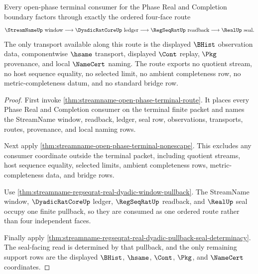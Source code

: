 \begin{theorem}
\label{thm:streamname-open-phase-four-face-lock}
Every open-phase terminal consumer for the Phase Real and Completion boundary factors through exactly the ordered four-face route
$$
\StreamNameUp\text{ window}\longrightarrow \DyadicRatCoreUp\text{ ledger}\longrightarrow \RegSeqRatUp\text{ readback}\longrightarrow \RealUp\text{ seal}.
$$
The only transport available along this route is the displayed $\BHist$ observation data, componentwise $\hsame$ transport, displayed $\Cont$ replay, $\Pkg$ provenance, and local $\NameCert$ naming. The route exports no quotient stream, no host sequence equality, no selected limit, no ambient completeness row, no metric-completeness datum, and no standard bridge row.
\end{theorem}
\begin{proof}
First invoke \autoref{thm:streamname-open-phase-terminal-route}. It places every Phase Real and Completion consumer on the terminal finite packet and names the StreamName window, readback, ledger, seal row, observations, transports, routes, provenance, and local naming rows.

Next apply \autoref{thm:streamname-open-phase-terminal-nonescape}. This excludes any consumer coordinate outside the terminal packet, including quotient streams, host sequence equality, selected limits, ambient completeness rows, metric-completeness data, and bridge rows.

Use \autoref{thm:streamname-regseqrat-real-dyadic-window-pullback}. The StreamName window, $\DyadicRatCoreUp$ ledger, $\RegSeqRatUp$ readback, and $\RealUp$ seal occupy one finite pullback, so they are consumed as one ordered route rather than four independent faces.

Finally apply \autoref{thm:streamname-regseqrat-real-dyadic-pullback-seal-determinacy}. The seal-facing read is determined by that pullback, and the only remaining support rows are the displayed $\BHist$, $\hsame$, $\Cont$, $\Pkg$, and $\NameCert$ coordinates.
\end{proof}

